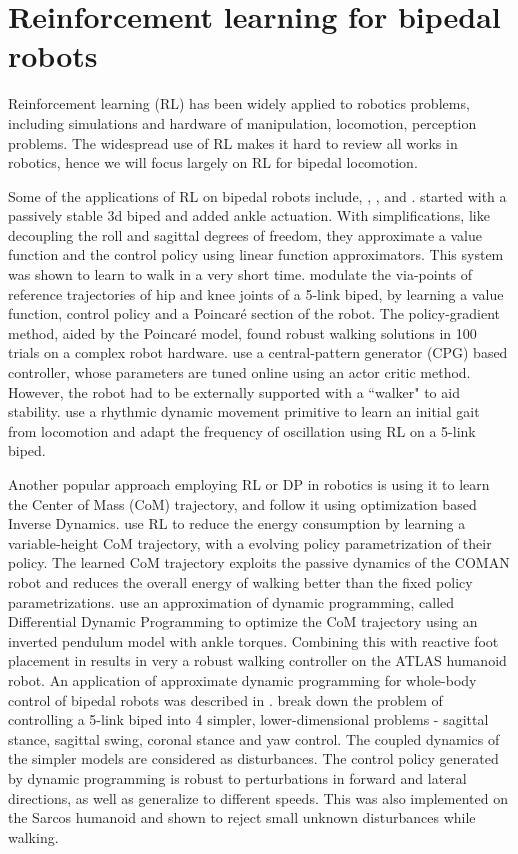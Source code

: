 \section{Reinforcement learning for bipedal robots}
Reinforcement learning (RL) has been widely applied to robotics problems, including simulations and hardware of manipulation, locomotion, perception problems. The widespread use of RL makes it hard to review all works in robotics, hence we will focus largely on RL for bipedal locomotion. 

Some of the applications of RL on bipedal robots include, \cite{tedrake2004stochastic}, \cite{morimoto2005poincare}, \cite{benbrahim1997biped} and \cite{nakanishi2004learning}.
\cite{tedrake2004stochastic} started with a passively stable 3d biped and added ankle actuation. With simplifications, like decoupling the roll and sagittal degrees of freedom, they approximate a value function and the control policy using linear function approximators. This system was shown to learn to walk in a very short time. \cite{morimoto2005poincare} modulate the via-points of reference trajectories of hip and knee joints of a 5-link biped, by learning a value function, control policy and a Poincar\'e section of the robot. The policy-gradient method, aided by the Poincar\'e model, found robust walking solutions in 100 trials on a complex robot hardware. \cite{benbrahim1997biped} use a central-pattern generator (CPG) based controller, whose parameters are tuned online using an actor critic method. However, the robot had to be externally supported with a ``walker" to aid stability. \cite{nakanishi2004learning} use a rhythmic dynamic movement primitive to learn an initial gait from locomotion and adapt the frequency of oscillation using RL on a 5-link biped.

Another popular approach employing RL or DP in robotics is using it to learn the Center of Mass (CoM) trajectory, and follow it using optimization based Inverse Dynamics. \cite{kormushev2011bipedal} use RL to reduce the energy consumption by learning a variable-height CoM trajectory, with a evolving policy parametrization of their policy. The learned CoM trajectory exploits the passive dynamics of the COMAN robot and reduces the overall energy of walking better than the fixed policy parametrizations. \cite{feng2015optimization} use an approximation of dynamic programming, called Differential Dynamic Programming to optimize the CoM trajectory using an inverted pendulum model with ankle torques. Combining this with reactive foot placement in \cite{feng2016robust} results in very a robust walking controller on the ATLAS humanoid robot. An application of approximate dynamic programming for whole-body control of bipedal robots was described in \cite{whitman2009control}. \cite{whitman2009control} break down the problem of controlling a 5-link biped into  4 simpler, lower-dimensional problems - sagittal stance, sagittal swing, coronal stance and yaw control. The coupled dynamics of the simpler models are considered as disturbances. The control policy generated by dynamic programming is robust to perturbations in forward and lateral directions, as well as generalize to different speeds. This was also implemented on the Sarcos humanoid and shown to reject small unknown disturbances while walking.


